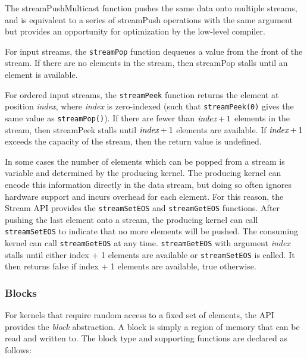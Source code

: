  The streamPushMulticast function pushes 
the same data onto multiple streams, and is equivalent to a series of streamPush 
operations with the same argument but provides an opportunity for optimization by the low-level compiler.

 For input streams, the {\tt streamPop} function dequeues a value from the front of the stream.  If there are no elements in the stream, then streamPop stalls until an element is available.

 For ordered input streams, the {\tt streamPeek} function returns the element at position {\it index}, where {\it index} is zero-indexed (such that {\tt streamPeek(0)} gives the same value as {\tt streamPop()}).  If there are fewer than $\mbox{\it index}+1$ elements in the stream, then streamPeek stalls until $\mbox{\it index}+1$ elements are available. If $\mbox{\it index}+1$ exceeds the capacity of the stream, then the 
return value is undefined.

 In some cases the number of elements which can 
be popped from a stream is variable and determined by the producing kernel. 
The producing kernel can encode this information directly in the data stream, 
but doing so often ignores hardware support and incurs overhead for each element. For this reason, the Stream API provides the {\tt streamSetEOS} and {\tt streamGetEOS} 
functions. After pushing the last element onto a stream, the producing kernel can call 
{\tt streamSetEOS} to indicate that no more elements will be pushed. The 
consuming kernel can call {\tt streamGetEOS} at any time. {\tt streamGetEOS} with argument  
{\it index} stalls until either index + 1 elements are available or {\tt streamSetEOS} is called. It then returns false if index + 1 elements are available, true otherwise. 

\subsubsection{Blocks}
\label{sec:blocks}

For kernels that require random access to a fixed set of elements, the API provides the {\it block} abstraction.  A block is simply a region of memory that can be read and written to.  The block type and 
supporting functions are declared as follows:

